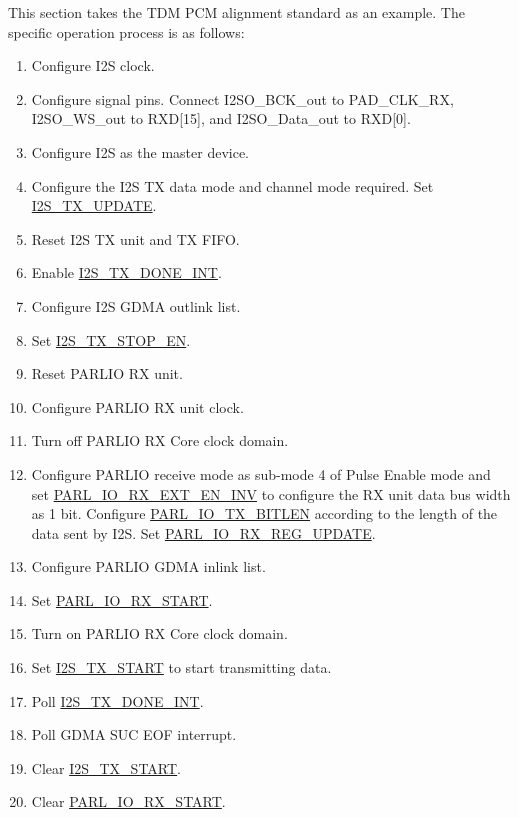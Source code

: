\documentclass[main\_\_EN.tex]{subfiles}
\begin{document}
This section takes the TDM PCM alignment standard as an example. The specific operation process is as follows:
\begin{enumerate}
    \item Configure I2S clock.
    \item Configure signal pins. Connect I2SO\_BCK\_out to PAD\_CLK\_RX, I2SO\_WS\_out to RXD[15], and I2SO\_Data\_out to RXD[0].
    \item Configure I2S as the master device.
    \item Configure the I2S TX data mode and channel mode required. Set \hyperref[fielddesc:I2STXUPDATE]{I2S\_TX\_UPDATE}.
    \item Reset I2S TX unit and TX FIFO.
    \item Enable \hyperref[int:I2STXDONEINT]{I2S\_TX\_DONE\_INT}.
    \item Configure I2S GDMA outlink list.
    \item Set \hyperref[fielddesc:I2STXSTOPEN]{I2S\_TX\_STOP\_EN}.
    \item Reset PARLIO RX unit.
    \item Configure PARLIO RX unit clock.
    \item Turn off PARLIO RX Core clock domain.
    \item Configure PARLIO receive mode as sub-mode 4 of Pulse Enable mode and set \hyperref[fielddesc:PARLIORXEXTENINV]{PARL\_IO\_RX\_EXT\_EN\_INV} to configure the RX unit data bus width as 1 bit. Configure \hyperref[fielddesc:PARLIOTXBITLEN]{PARL\_IO\_TX\_BITLEN} according to the length of the data sent by I2S. Set \hyperref[fielddesc:PARLIORXREGUPDATE]{PARL\_IO\_RX\_REG\_UPDATE}.
    \item Configure PARLIO GDMA inlink list.
    \item Set \hyperref[fielddesc:PARLIORXSTART]{PARL\_IO\_RX\_START}.
    \item Turn on PARLIO RX Core clock domain.
    \item Set \hyperref[fielddesc:I2STXSTART]{I2S\_TX\_START} to start transmitting data.
    \item Poll \hyperref[int:I2STXDONEINT]{I2S\_TX\_DONE\_INT}.
    \item Poll GDMA SUC EOF interrupt.
    \item Clear \hyperref[fielddesc:I2STXSTART]{I2S\_TX\_START}.
    \item Clear \hyperref[fielddesc:PARLIORXSTART]{PARL\_IO\_RX\_START}.
\end{enumerate}
\end{document}
